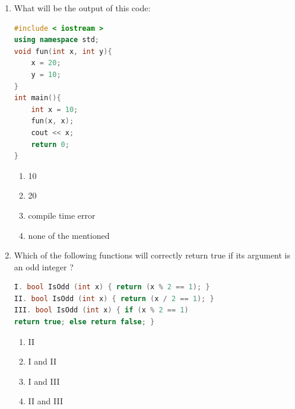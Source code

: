 \documentclass[10pt]{article}
\begin{document}
\begin{enumerate}
\begin{lstlisting}[language=C++]
\end{lstlisting}
\begin{multicols}{4}
\begin{enumerate}
    \item 123456789
    \item error
    \item 0123456789
    \item 0
\end{enumerate}
\end{multicols}









\item What will be the output of this code:
\begin{lstlisting}[language=C++]
#include < iostream >
using namespace std;
void fun(int x, int y){
    x = 20;
    y = 10;
}
int main(){
    int x = 10;
    fun(x, x);
    cout << x;
    return 0;
}

\end{lstlisting}
\begin{multicols}{4}
\begin{enumerate}
    \item 10
    \item 20
    \item compile time error
    \item none of the mentioned
\end{enumerate}
\end{multicols}















\item Which of the following functions will correctly return true if its argument is an odd integer ?
\begin{lstlisting}[language=C++]
I. bool IsOdd (int x) { return (x % 2 == 1); } 
II. bool IsOdd (int x) { return (x / 2 == 1); } 
III. bool IsOdd (int x) { if (x % 2 == 1) 
return true; else return false; } 
\end{lstlisting}
\begin{multicols}{4}
\begin{enumerate}
    \item II
    \item I and II
    \item I and III
    \item II and III 
\end{enumerate}
\end{multicols}








\end{enumerate}
\end{document}
